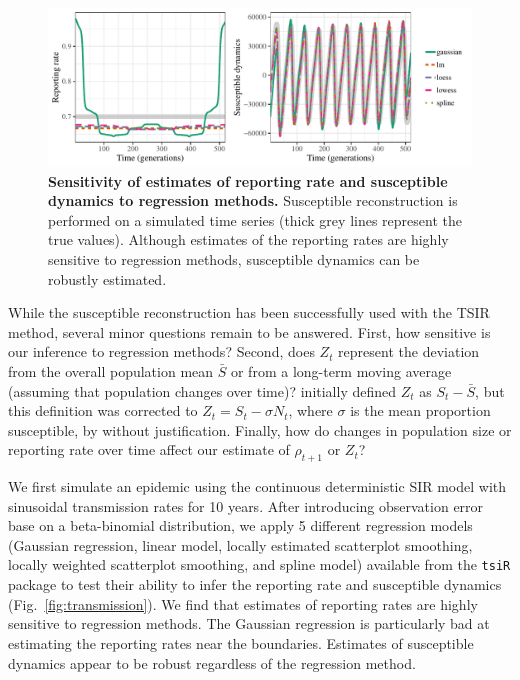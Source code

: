 \documentclass{article}
\newcommand{\fref}[1]{Fig.~\ref{fig:#1}}
\begin{document}
\begin{figure}[!t]
\includegraphics[width=\textwidth]{../figure/susceptible_reconstruction_tsir.pdf}
\caption{
\textbf{Sensitivity of estimates of reporting rate and susceptible dynamics to regression methods.}
Susceptible reconstruction is performed on a simulated time series (thick grey lines represent the true values).
Although estimates of the reporting rates are highly sensitive to regression methods, susceptible dynamics can be robustly estimated.
}
\label{fig:tsirrecon}
\end{figure}

While the susceptible reconstruction has been successfully used with the TSIR method, 
several minor questions remain to be answered.
First, how sensitive is our inference to regression methods?
Second, does $Z_t$ represent the deviation from the overall population mean $\bar{S}$ or from a long-term moving average (assuming that population changes over time)?
\cite{finkenstadt2000time} initially defined $Z_t$ as $S_t - \bar{S}$, but this definition was corrected to $Z_t = S_t - \sigma N_t$, where $\sigma$ is the mean proportion susceptible, by \cite{dalziel2016persistent} without justification.
Finally, how do changes in population size or reporting rate over time affect our estimate of $\rho_{t+1}$ or $Z_t$?

We first simulate an epidemic using the continuous deterministic SIR model with sinusoidal transmission rates for 10 years.
After introducing observation error base on a beta-binomial distribution, we apply 5 different regression models (Gaussian regression, linear model, locally estimated scatterplot smoothing, locally weighted scatterplot smoothing, and spline model) available from the \texttt{tsiR} package to test their ability to infer the reporting rate and susceptible dynamics (\fref{transmission}).
We find that estimates of reporting rates are highly sensitive to regression methods.
The Gaussian regression is particularly bad at estimating the reporting rates near the boundaries.
Estimates of susceptible dynamics appear to be robust regardless of the regression method.
\end{document}
